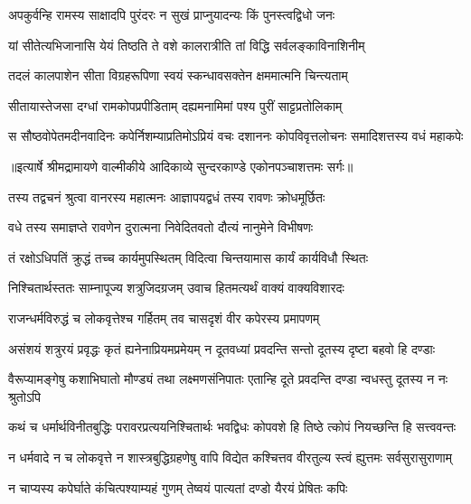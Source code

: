 \twolineshloka
{अपकुर्वन्हि रामस्य साक्षादपि पुरंदरः}
{न सुखं प्राप्नुयादन्यः किं पुनस्त्वद्विधो जनः} %

\twolineshloka
{यां सीतेत्यभिजानासि येयं तिष्ठति ते वशे}
{कालरात्रीति तां विद्धि सर्वलङ्काविनाशिनीम्} %

\twolineshloka
{तदलं कालपाशेन सीता विग्रहरूपिणा}
{स्वयं स्कन्धावसक्तेन क्षममात्मनि चिन्त्यताम्} %

\twolineshloka
{सीतायास्तेजसा दग्धां रामकोपप्रपीडिताम्}
{दह्यमनामिमां पश्य पुरीं साट्टप्रतोलिकाम्} %

\fourlineindentedshloka
{स सौष्ठवोपेतमदीनवादिनः}
{ कपेर्निशम्याप्रतिमोऽप्रियं वचः}
{दशाननः कोपविवृत्तलोचनः}
{ समादिशत्तस्य वधं महाकपेः} %


{॥इत्यार्षे श्रीमद्रामायणे वाल्मीकीये आदिकाव्ये सुन्दरकाण्डे एकोनपञ्चाशत्तमः सर्गः॥}


\twolineshloka
{तस्य तद्वचनं श्रुत्वा वानरस्य महात्मनः}
{आज्ञापयद्वधं तस्य रावणः क्रोधमूर्छितः} %

\twolineshloka
{वधे तस्य समाज्ञप्ते रावणेन दुरात्मना}
{निवेदितवतो दौत्यं नानुमेने विभीषणः} %

\twolineshloka
{तं रक्षोऽधिपतिं क्रुद्धं तच्च कार्यमुपस्थितम्}
{विदित्वा चिन्तयामास कार्यं कार्यविधौ स्थितः} %

\twolineshloka
{निश्चितार्थस्ततः साम्नापूज्य शत्रुजिदग्रजम्}
{उवाच हितमत्यर्थं वाक्यं वाक्यविशारदः} %

\twolineshloka
{राजन्धर्मविरुद्धं च लोकवृत्तेश्च गर्हितम्}
{तव चासदृशं वीर कपेरस्य प्रमापणम्} %

\fourlineindentedshloka
{असंशयं शत्रुरयं प्रवृद्धः}
{ कृतं ह्यनेनाप्रियमप्रमेयम्}
{न दूतवध्यां प्रवदन्ति सन्तो}
{ दूतस्य दृष्टा बहवो हि दण्डाः} %

\fourlineindentedshloka
{वैरूप्यामङ्गेषु कशाभिघातो}
{ मौण्ड्यं तथा लक्ष्मणसंनिपातः}
{एतान्हि दूते प्रवदन्ति दण्डा}
{न्वधस्तु दूतस्य न नः श्रुतोऽपि} %

\fourlineindentedshloka
{कथं च धर्मार्थविनीतबुद्धिः}
{ परावरप्रत्ययनिश्चितार्थः}
{भवद्विधः कोपवशे हि तिष्ठे}
{त्कोपं नियच्छन्ति हि सत्त्ववन्तः} %

\fourlineindentedshloka
{न धर्मवादे न च लोकवृत्ते}
{ न शास्त्रबुद्धिग्रहणेषु वापि}
{विद्येत कश्चित्तव वीरतुल्य}
{स्त्वं ह्युत्तमः सर्वसुरासुराणाम्} %

\twolineshloka
{न चाप्यस्य कपेर्घाते कंचित्पश्याम्यहं गुणम्}
{तेष्वयं पात्यतां दण्डो यैरयं प्रेषितः कपिः} %

